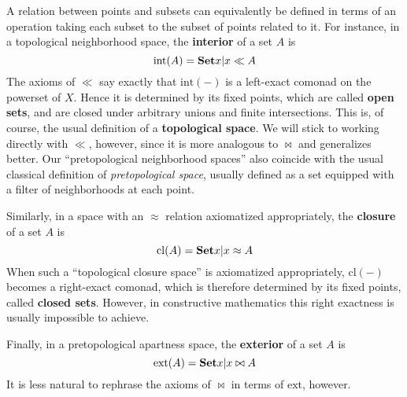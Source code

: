 \documentclass{article}
\def\int{\mathrm{int}}
\def\ext{\mathrm{ext}}
\def\cl{\mathrm{cl}}
\begin{document}
A relation between points and subsets can equivalently be defined in terms of an operation taking each subset to the subset of points related to it.
For instance, in a topological neighborhood space, the \textbf{interior} of a set $A$ is
\[ \int(A) = \setof{ x | x\ll A } \]
The axioms of $\ll$ say exactly that $\int(-)$ is a left-exact comonad on the powerset of $X$.
Hence it is determined by its fixed points, which are called \textbf{open sets}, and are closed under arbitrary unions and finite intersections.
This is, of course, the usual definition of a \textbf{topological space}.
We will stick to working directly with $\ll$, however, since it is more analogous to $\bowtie$ and generalizes better.
Our ``pretopological neighborhood spaces'' also coincide with the usual classical definition of \emph{pretopological space}, usually defined as a set equipped with a filter of neighborhoods at each point.

Similarly, in a space with an $\approx$ relation axiomatized appropriately, the \textbf{closure} of a set $A$ is
\[ \cl(A) = \setof{x | x \approx A } \]
When such a ``topological closure space'' is axiomatized appropriately, $\cl(-)$ becomes a right-exact comonad, which is therefore determined by its fixed points, called \textbf{closed sets}.
However, in constructive mathematics this right exactness is usually impossible to achieve.

Finally, in a pretopological apartness space, the \textbf{exterior} of a set $A$ is
\[ \ext(A) = \setof{ x | x\bowtie A } \]
It is less natural to rephrase the axioms of $\bowtie$ in terms of $\ext$, however.
\end{document}
